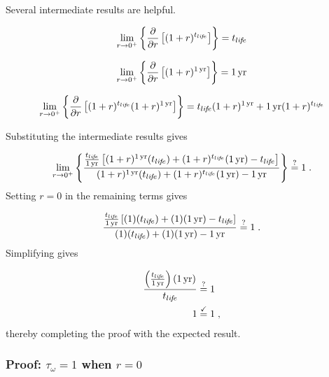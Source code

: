 Several intermediate results are helpful.

\begin{equation}
  \lim_{r \to 0^+} \left\{\frac{\partial}{\partial r} \left[ (1 + r)^{t_{li\!f\!e}} \right] \right\} = t_{li\!f\!e}
\end{equation}

\begin{equation}
  \lim_{r \to 0^+} \left\{\frac{\partial}{\partial r} \left[ (1 + r)^{1\,\mathrm{yr}} \right] \right\} = 1\,\mathrm{yr}
\end{equation}

\begin{equation}
  \lim_{r \to 0^+} \left\{\frac{\partial}{\partial r} \left[ (1 + r)^{t_{li\!f\!e}} (1 + r)^{1\,\mathrm{yr}} \right] \right\} = t_{li\!f\!e} (1 + r)^{1\,\mathrm{yr}}  + 1\,\mathrm{yr} (1 + r)^{t_{li\!f\!e}} 
\end{equation}

Substituting the intermediate results gives

\begin{equation}
  \lim_{r \to 0^+} \left\{
                         \frac{\frac{\tlife}{\oneyr}
                         \left[ (1 + r)^{\oneyr} (\tlife) + 
                         (1 + r)^{\tlife} (\oneyr) - 
                         \tlife \right]}
                        {(1 + r)^{\oneyr} (\tlife) + 
                         (1 + r)^{\tlife} (\oneyr) - 
                         \oneyr}
                    \right\} \questionequal 1 \; .
\end{equation}
%
Setting $r = 0$ in the remaining terms gives

\begin{equation}
  \frac{\frac{\tlife}{\oneyr}
              \left[ (1) (\tlife) + 
                     (1) (\oneyr) - 
                     \tlife
              \right]}
       {(1) (\tlife) + 
        (1) (\oneyr) - 
        \oneyr} \questionequal 1 \; .
\end{equation}
%
Simplifying gives

\begin{align}
  \frac{\left( \frac{t_{li\!f\!e}}{1\,\mathrm{yr}} \right) (1\,\mathrm{yr})}{t_{li\!f\!e}} &\stackrel{?}{=} 1 \\
  1 &\stackrel{\checkmark}{=} 1 \; ,
\end{align}
%
thereby completing the proof with the expected result. 



\subsubsection{Proof: $\tau_\omega = 1$ when $r = 0$}
\label{sec:proof_R_omega}

